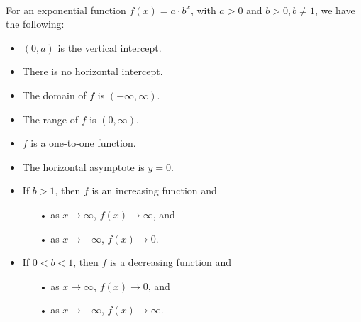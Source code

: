 \begin{myDefinition}~\\[0.5mm]
For an exponential function $f(x) = a\cdot b^x$, with $a> 0$ and $b>0,b\neq1$, we have the following:\\[3mm]
\begin{minipage}{0.6\linewidth}
	\begin{itemize}
	\setlength{\itemsep}{1mm}
		\item $(0,a)$ is the vertical intercept.
		\item There is no horizontal intercept.
		\item The domain of $f$ is $(-\infty, \infty)$.
		\item The range of $f$ is $(0,\infty)$.
		\item $f$ is a one-to-one function.
		\item The horizontal asymptote is $y=0$.
		\item If $b>1$, then $f$ is an increasing function and
			\begin{itemize}
			\setlength{\itemsep}{0in}
				\item[\small{•}] as $x\rightarrow \infty$, $f(x)\rightarrow \infty$, and
				\item[\small{•}] as $x\rightarrow -\infty$, $f(x)\rightarrow 0$.
			\end{itemize}	
		\item If $0<b<1$, then $f$ is a decreasing function and
			\begin{itemize}
			\setlength{\itemsep}{0in}
				\item[\small{•}] as $x\rightarrow \infty$, $f(x)\rightarrow 0$, and
				\item[\small{•}] as $x\rightarrow -\infty$, $f(x)\rightarrow \infty$.
			\end{itemize}	
	\end{itemize}
	\end{minipage}
	\begin{minipage}{0.4\linewidth}
			\begin{center}
			~\\[-0.8em]
				\label{fig:expintro-def1}


\end{center}
\end{minipage}
\end{myDefinition}
